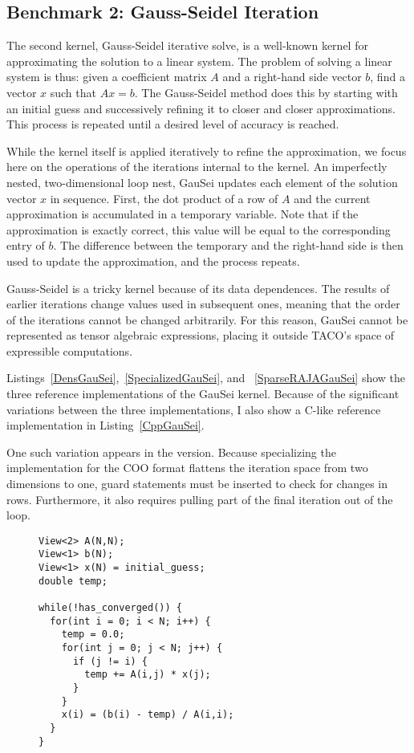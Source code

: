 \subsection{Benchmark 2: Gauss-Seidel Iteration}

The second kernel, Gauss-Seidel iterative solve, is a well-known kernel for approximating the solution to a linear system.
The problem of solving a linear system is thus: given a coefficient matrix $A$ and a right-hand side vector $b$, find a vector $x$ such that $Ax=b$.
The Gauss-Seidel method does this by starting with an initial guess and successively refining it to closer and closer approximations.
This process is repeated until a desired level of accuracy is reached.

While the kernel itself is applied iteratively to refine the approximation, we focus here on the operations of the iterations internal to the kernel.
An imperfectly nested, two-dimensional loop nest, GauSei updates each element of the solution vector $x$ in sequence.
First, the dot product of a row of $A$ and the current approximation is accumulated in a temporary variable.
Note that if the approximation is exactly correct, this value will be equal to the corresponding entry of $b$. 
The difference between the temporary and the right-hand side is then used to update the approximation, and the process repeats.

Gauss-Seidel is a tricky kernel because of its data dependences.
The results of earlier iterations change values used in subsequent ones, meaning that the order of the iterations cannot be changed arbitrarily. 
For this reason, GauSei cannot be represented as tensor algebraic expressions, placing it outside TACO's space of expressible computations.

Listings~\ref{DensGauSei},~\ref{SpecializedGauSei}, and ~\ref{SparseRAJAGauSei} show the three reference implementations of the GauSei kernel.
Because of the significant variations between the three implementations, I also show a C-like reference implementation in Listing~\ref{CppGauSei}.

One such variation appears in the \specialized{} version. 
Because specializing the implementation for the COO format flattens the iteration space from two dimensions to one, guard statements must be inserted to check for changes in rows. 
Furthermore, it also requires pulling part of the final iteration out of the loop.

\begin{figure}
\begin{lstlisting}[caption={C-like version of Gauss-Seidel iteration},label=CppGauSei]
View<2> A(N,N);
View<1> b(N);
View<1> x(N) = initial_guess;
double temp;

while(!has_converged()) {
  for(int i = 0; i < N; i++) {
    temp = 0.0;
    for(int j = 0; j < N; j++) {
      if (j != i) {
        temp += A(i,j) * x(j);
      }
    }
    x(i) = (b(i) - temp) / A(i,i);
  }
}
\end{lstlisting}
\end{figure}

